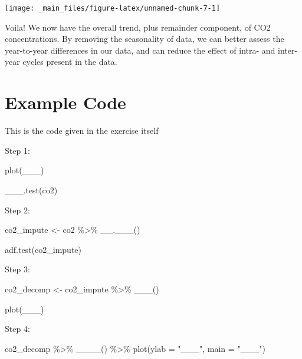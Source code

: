\documentclass[
]{book}
\newenvironment{Shaded}{\begin{snugshade}}{\end{snugshade}}
\newcommand{\AttributeTok}[1]{\textcolor[rgb]{0.77,0.63,0.00}{#1}}
\newcommand{\FunctionTok}[1]{\textcolor[rgb]{0.00,0.00,0.00}{#1}}
\newcommand{\NormalTok}[1]{#1}
\newcommand{\OtherTok}[1]{\textcolor[rgb]{0.56,0.35,0.01}{#1}}
\newcommand{\SpecialCharTok}[1]{\textcolor[rgb]{0.00,0.00,0.00}{#1}}
\newcommand{\StringTok}[1]{\textcolor[rgb]{0.31,0.60,0.02}{#1}}
\begin{document}
\begin{center}\texttt{[image: \_main\_files/figure-latex/unnamed-chunk-7-1]} \end{center}

Voila! We now have the overall trend, plus remainder component, of CO2 concentrations. By removing the seasonality of data, we can better assess the year-to-year differences in our data, and can reduce the effect of intra- and inter-year cycles present in the data.

\hypertarget{example-code}{%
\section{Example Code}\label{example-code}}

This is the code given in the exercise itself

Step 1:

\begin{Shaded}
\begin{Highlighting}[]
\FunctionTok{plot}\NormalTok{(\_\_\_)}

\FunctionTok{\_\_\_.test}\NormalTok{(co2)}
\end{Highlighting}
\end{Shaded}

Step 2:

\begin{Shaded}
\begin{Highlighting}[]
\NormalTok{co2\_impute }\OtherTok{\textless{}{-}}\NormalTok{ co2 }\SpecialCharTok{\%\textgreater{}\%} 
  \FunctionTok{\_\_.\_\_\_}\NormalTok{()}

\FunctionTok{adf.test}\NormalTok{(co2\_impute)}
\end{Highlighting}
\end{Shaded}

Step 3:

\begin{Shaded}
\begin{Highlighting}[]
\NormalTok{co2\_decomp }\OtherTok{\textless{}{-}}\NormalTok{ co2\_impute }\SpecialCharTok{\%\textgreater{}\%} 
  \FunctionTok{\_\_\_}\NormalTok{()}

\FunctionTok{plot}\NormalTok{(\_\_\_)}
\end{Highlighting}
\end{Shaded}

Step 4:

\begin{Shaded}
\begin{Highlighting}[]
\NormalTok{co2\_decomp }\SpecialCharTok{\%\textgreater{}\%} 
  \FunctionTok{\_\_\_\_}\NormalTok{() }\SpecialCharTok{\%\textgreater{}\%} 
  \FunctionTok{plot}\NormalTok{(}\AttributeTok{ylab =} \StringTok{"\_\_\_"}\NormalTok{, }\AttributeTok{main =} \StringTok{"\_\_\_"}\NormalTok{)}
\end{Highlighting}
\end{Shaded}
\end{document}
